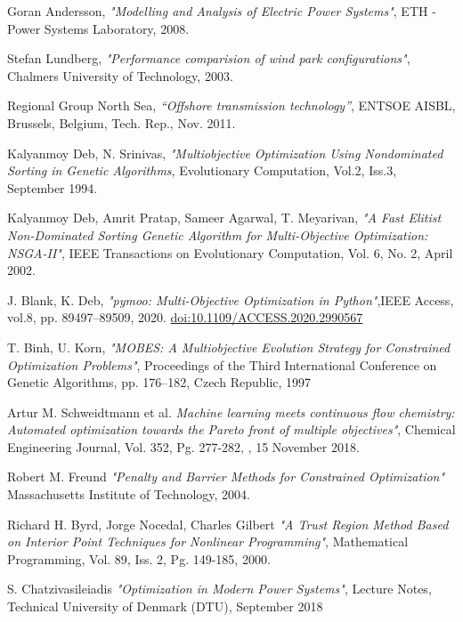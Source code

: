 \documentclass[a4paper,11pt, titlepage, twoside]{article}
\begin{document}
\begin{thebibliography}{99}
{Goran Andersson},
\textit{"Modelling and Analysis of Electric Power Systems"}, ETH - Power Systems Laboratory, 2008.

{Stefan Lundberg},
\textit{"Performance comparision of wind park configurations"}, Chalmers University of Technology, 2003.

{Regional Group North Sea},
\textit{“Offshore transmission technology”}, ENTSOE AISBL, Brussels, Belgium, Tech. Rep., Nov. 2011.



{Kalyanmoy Deb, N. Srinivas},
\textit{"Multiobjective Optimization Using Nondominated Sorting in Genetic Algorithms}, Evolutionary Computation, Vol.2, Iss.3, September 1994.

{Kalyanmoy Deb, Amrit Pratap, Sameer Agarwal, T. Meyarivan},
\textit{"A Fast Elitist Non-Dominated Sorting Genetic Algorithm for Multi-Objective Optimization: NSGA-II"}, IEEE Transactions on Evolutionary Computation, Vol. 6, No. 2, April 2002.

{J. Blank, K. Deb},
\textit{"pymoo: Multi-Objective Optimization in Python"},IEEE Access, vol.8, pp. 89497–89509, 2020. \href{https://ieeexplore.ieee.org/document/9078759}{doi:10.1109/ACCESS.2020.2990567}

{T. Binh, U. Korn},
\textit{"MOBES: A Multiobjective Evolution Strategy for Constrained Optimization Problems"}, Proceedings of the Third International Conference on Genetic Algorithms, 
pp. 176–182, Czech Republic, 1997

{Artur M. Schweidtmann et al.}
\textit{Machine learning meets continuous flow chemistry: Automated
optimization towards the Pareto front of multiple objectives"}, Chemical Engineering Journal, Vol. 352, Pg. 277-282, , 15 November 2018.

{Robert M. Freund}
\textit{"Penalty and Barrier Methods for Constrained Optimization"} Massachusetts Institute of Technology, 2004.

{Richard H. Byrd, Jorge Nocedal, Charles Gilbert}
\textit{"A Trust Region Method Based on Interior Point Techniques for Nonlinear Programming"}, Mathematical Programming, Vol. 89, Iss. 2, Pg. 149-185, 2000.
 

{S. Chatzivasileiadis}
\textit{"Optimization in Modern Power Systems"}, Lecture Notes, Technical University of Denmark (DTU), September 2018


\end{thebibliography}
\end{document}
